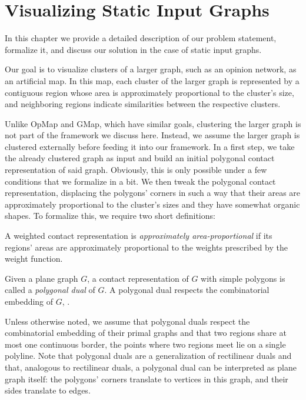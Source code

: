\chapter{Visualizing Static Input Graphs}
\label{chap:visualizing-static-input-graphs}

In this chapter we provide a detailed description of our problem statement, formalize it, and discuss our solution in the case of static input graphs.

Our goal is to visualize clusters of a larger graph, such as an opinion network, as an artificial map. In this map, each cluster of the larger graph is represented by a contiguous region whose area is approximately proportional to the cluster's size, and neighboring regions indicate similarities between the respective clusters.

Unlike OpMap and GMap, which have similar goals, clustering the larger graph is not part of the framework we discuss here. Instead, we assume the larger graph is clustered externally before feeding it into our framework. In a first step, we take the already clustered graph as input and build an initial polygonal contact representation of said graph. Obviously, this is only possible under a few conditions that we formalize in a bit. We then tweak the polygonal contact representation, displacing the polygons' corners in such a way that their areas are approximately proportional to the cluster's sizes and they have somewhat organic shapes. To formalize this, we require two short definitions:

\begin{definition}
	A weighted contact representation is \emph{approximately area-proportional} if its regions' areas are approximately proportional to the weights prescribed by the weight function.
\end{definition}

\begin{definition}
	Given a plane graph $G$, a contact representation of $G$ with simple polygons is called a \emph{polygonal dual} of $G$. A polygonal dual respects the combinatorial embedding of $G$, \ie{} \todo{}.
\end{definition}

Unless otherwise noted, we assume that polygonal duals respect the combinatorial embedding of their primal graphs and that two regions share at most one continuous border, \ie{} the points where two regions meet lie on a single polyline. Note that polygonal duals are a generalization of rectilinear duals and that, analogous to rectilinear duals, a polygonal dual can be interpreted as plane graph itself: the polygons' corners translate to vertices in this graph, and their sides translate to edges.

